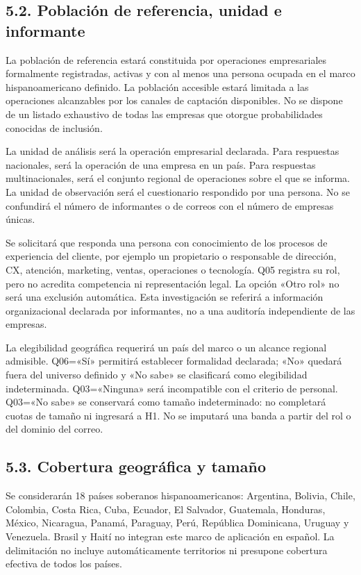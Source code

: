 \documentclass[12pt,letterpaper]{article}
\begin{document}
\subsection*{5.2. Población de referencia, unidad e informante}
La población de referencia estará constituida por operaciones empresariales formalmente registradas, activas y con al menos una persona ocupada en el marco hispanoamericano definido. La población accesible estará limitada a las operaciones alcanzables por los canales de captación disponibles. No se dispone de un listado exhaustivo de todas las empresas que otorgue probabilidades conocidas de inclusión.

La unidad de análisis será la operación empresarial declarada. Para respuestas nacionales, será la operación de una empresa en un país. Para respuestas multinacionales, será el conjunto regional de operaciones sobre el que se informa. La unidad de observación será el cuestionario respondido por una persona. No se confundirá el número de informantes o de correos con el número de empresas únicas.

Se solicitará que responda una persona con conocimiento de los procesos de experiencia del cliente, por ejemplo un propietario o responsable de dirección, CX, atención, marketing, ventas, operaciones o tecnología. Q05 registra su rol, pero no acredita competencia ni representación legal. La opción «Otro rol» no será una exclusión automática. Esta investigación se referirá a información organizacional declarada por informantes, no a una auditoría independiente de las empresas.

La elegibilidad geográfica requerirá un país del marco o un alcance regional admisible. Q06=«Sí» permitirá establecer formalidad declarada; «No» quedará fuera del universo definido y «No sabe» se clasificará como elegibilidad indeterminada. Q03=«Ninguna» será incompatible con el criterio de personal. Q03=«No sabe» se conservará como tamaño indeterminado: no completará cuotas de tamaño ni ingresará a H1. No se imputará una banda a partir del rol o del dominio del correo.

\subsection*{5.3. Cobertura geográfica y tamaño}
Se considerarán 18 países soberanos hispanoamericanos: Argentina, Bolivia, Chile, Colombia, Costa Rica, Cuba, Ecuador, El Salvador, Guatemala, Honduras, México, Nicaragua, Panamá, Paraguay, Perú, República Dominicana, Uruguay y Venezuela. Brasil y Haití no integran este marco de aplicación en español. La delimitación no incluye automáticamente territorios ni presupone cobertura efectiva de todos los países.
\end{document}
